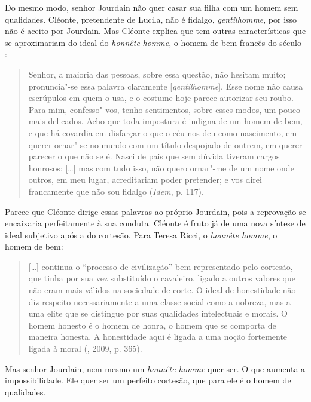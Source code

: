 Do mesmo modo, senhor Jourdain não quer casar sua filha com um homem sem
qualidades. Cléonte, pretendente de Lucila, não é fidalgo,
\emph{gentilhomme}, por isso não é aceito por Jourdain. Mas Cléonte
explica que tem outras características que se aproximariam do ideal do
\emph{honnête} \emph{homme}, o homem de bem francês do século :

\begin{quote}
Senhor, a maioria das pessoas, sobre essa questão, não hesitam muito;
pronuncia"-se essa palavra claramente [\emph{gentilhomme}]. Esse nome
não causa escrúpulos em quem o usa, e o costume hoje parece autorizar
seu roubo. Para mim, confesso"-vos, tenho sentimentos, sobre esses modos,
um pouco mais delicados. Acho que toda impostura é indigna de um homem
de bem, e que há covardia em disfarçar o que o céu nos deu como
nascimento, em querer ornar"-se no mundo com um título despojado de
outrem, em querer parecer o que não se é. Nasci de pais que sem dúvida
tiveram cargos honrosos; [\ldots{}] mas com tudo isso, não quero
ornar"-me de um nome onde outros, em meu lugar, acreditariam poder
pretender; e vos direi francamente que não sou fidalgo (\emph{Idem}, p. 117).
\end{quote}

Parece que Cléonte dirige essas palavras ao próprio Jourdain, pois a
reprovação se encaixaria perfeitamente à sua conduta. Cléonte é fruto já
de uma nova síntese de ideal subjetivo após a do cortesão. Para Teresa Ricci, o \emph{honnête homme}, o homem de bem:

\begin{quote}
[\ldots{}] continua o ``processo de civilização'' bem representado pelo
cortesão, que tinha por sua vez substituído o cavaleiro, ligado a outros
valores que não eram mais válidos na sociedade de corte. O ideal de
honestidade não diz respeito necessariamente a uma classe social como a
nobreza, mas a uma elite que se distingue por suas qualidades
intelectuais e morais. O homem honesto é o homem de honra, o homem que
se comporta de maneira honesta. A honestidade aqui é ligada a uma noção
fortemente ligada à moral (, 2009, p. 365).
\end{quote}

Mas senhor Jourdain, nem mesmo um \emph{honnête homme} quer ser.
O que aumenta a impossibilidade. Ele quer ser um perfeito cortesão, que
para ele é o homem de qualidades.

